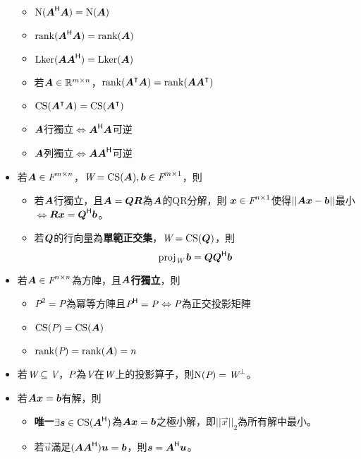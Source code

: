 \begin{itemize}
\begin{itemize}
		\item $\Ker(\mat{A}\herm \mat{A}) = \Ker(\mat{A})$
		\item $\rnk(\mat{A}\herm \mat{A}) = \rnk(\mat{A})$
		\item $\lker(\mat{A} \mat{A}\herm) = \lker(\mat{A})$
		\item 若$\mat{A} \in \R^{m \times n}$，$\rnk(\mat{A}^\intercal \mat{A}) = \rnk(\mat{A}\mat{A}^\intercal)$
		\item $\cs(\mat{A}^\intercal\mat{A}) = \cs(\mat{A}^\intercal)$
		\item $\mat{A}$行獨立$\iff$$\mat{A}\herm\mat{A}$可逆
		\item $\mat{A}$列獨立$\iff$$\mat{A}\mat{A}\herm$可逆
    \end{itemize}
    \item 若$\mat{A} \in \F^{m \times n}$，$\spc{W} = \cs(\mat{A}), \vec{b} \in \F^{m \times 1}$，則
	\begin{itemize}
		\item 若$\mat{A}$行獨立，且$\mat{A} = \mat{QR}$為$\mat{A}$的QR分解，則
		$\vec{x} \in \F^{n \times 1}$使得$||\mat{A}\vec{x} - \vec{b}||$最小$\iff$$\mat{R}\vec{x} = \mat{Q}\herm \vec{b}$。
		\item 若$\mat{Q}$的行向量為\textbf{單範正交集}，$\spc{W} = \cs(\mat{Q})$，則
		\begin{equation}
			\proj{\spc{W}}{b} = \mat{Q}\mat{Q}\herm\vec{b}
		\end{equation}
    \end{itemize}
    \item 若$\mat{A} \in \F^{n \times n}$為方陣，且$\mat{A}$\textbf{行獨立}，則
	\begin{itemize}
		\item $\P^2 = \P$為冪等方陣且$\P\herm = \P$$\iff$$\P$為正交投影矩陣
		\item $\cs(\P) = \cs(\mat{A})$
		\item $\rnk(\P) = \rnk(\mat{A}) = n$
    \end{itemize}
    \item 若$\spc{W} \subseteq \V$，$\P$為$\V$在$\spc{W}$上的投影算子，則$\Ker(\P) = \spc{W}^{\perp}$。
    \item 若$\mat{A}\vec{x} = \vec{b}$有解，則
	\begin{itemize}
		\item \textbf{唯一}$\exists \vec{s} \in \cs(\mat{A}\herm)$為$\mat{A}\vec{x} = \vec{b}$之極小解，即$||\vec{x}||_2$為所有解中最小。
		\item 若$\vec{u}$滿足$(\mat{AA}\herm)\vec{u} = \vec{b}$，則$\vec{s} = \mat{A}\herm\vec{u}$。

\end{itemize}
\end{itemize}
